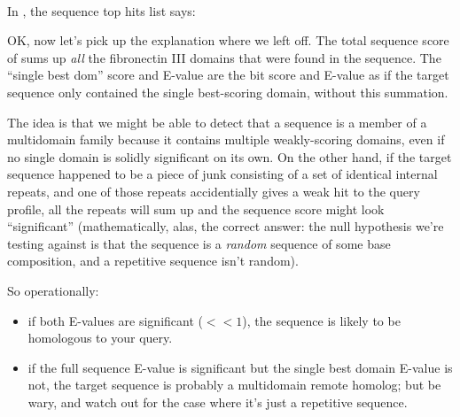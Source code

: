    \vspace{1ex}
    \\
   \vspace{1ex}

In , the sequence top hits list says:


OK, now let's pick up the explanation where we left off. The total
sequence score of \SFSbitscore{} sums up \emph{all} the fibronectin III domains
that were found in the  sequence. The ``single best
dom'' score and E-value are the bit score and E-value as if the target
sequence only contained the single best-scoring domain, without this
summation.

The idea is that we might be able to detect that a sequence is a
member of a multidomain family because it contains multiple
weakly-scoring domains, even if no single domain is solidly
significant on its own.  On the other hand, if the target sequence
happened to be a piece of junk consisting of a set of identical
internal repeats, and one of those repeats accidentially gives a weak
hit to the query profile, all the repeats will sum up and the sequence
score might look ``significant'' (mathematically, alas, the
correct answer: the null hypothesis we're testing against is that the
sequence is a \emph{random} sequence of some base composition, and a
repetitive sequence isn't random).

So operationally:
\begin{itemize}
\item if both E-values are significant ($<<1$), the sequence is likely
      to be homologous to your query.
\item if the full sequence E-value is significant but the single best domain
      E-value is not, the target sequence is probably a multidomain remote 
      homolog; but be wary, and watch out for the case where it's just a repetitive
      sequence.
\end{itemize}

